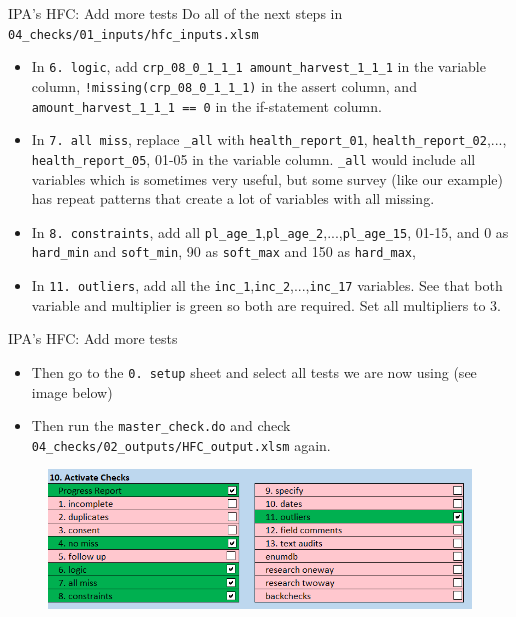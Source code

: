 \documentclass[aspectratio=169]{beamer}
\begin{document}
\begin{frame}{IPA's HFC: Add more tests}
	Do all of the next steps in \texttt{04\_checks/01\_inputs/hfc\_inputs.xlsm}
	\begin{itemize}
		\item In \texttt{6. logic}, add \texttt{crp\_08\_0\_1\_1\_1 amount\_harvest\_1\_1\_1} in the variable column, \texttt{!missing(crp\_08\_0\_1\_1\_1)} in the assert column, and \texttt{amount\_harvest\_1\_1\_1 == 0} in the if-statement column.
		\item In \texttt{7. all miss}, replace \texttt{\_all} with \texttt{health\_report\_01}, \texttt{health\_report\_02},..., \texttt{health\_report\_05}, 01-05 in the variable column. \texttt{\_all} would include all variables which is sometimes very useful, but some survey (like our example) has repeat patterns that create a lot of variables with all missing.
		\item In \texttt{8. constraints}, add all \texttt{pl\_age\_1},\texttt{pl\_age\_2},...,\texttt{pl\_age\_15}, 01-15, and 0 as \texttt{hard\_min} and \texttt{soft\_min}, 90 as \texttt{soft\_max} and 150 as \texttt{hard\_max},
		\item In \texttt{11. outliers}, add all the \texttt{inc\_1},\texttt{inc\_2},...,\texttt{inc\_17} variables. See that both variable and multiplier is green so both are required. Set all multipliers to 3.
	\end{itemize}
\end{frame}

\begin{frame}{IPA's HFC: Add more tests}	
	\begin{itemize}
		\item Then go to the \texttt{0. setup} sheet and select all tests we are now using (see image below)
		\item Then run the \texttt{master\_check.do} and check \texttt{04\_checks/02\_outputs/HFC\_output.xlsm} again.
	\end{itemize}
	
	\begin{figure}
		\centering
		\includegraphics[width=.75\linewidth]{img/ipacheck-setup-add4.png}
	\end{figure}
\end{frame}
\end{document}
